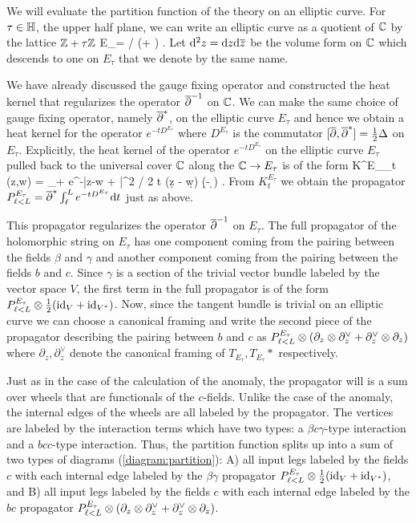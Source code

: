 We will evaluate the partition function of the theory on an elliptic curve. 
For $\tau \in \mathbb H$, the upper half plane, we can write an elliptic curve as a quotient of $\mathbb C$ by the lattice $\mathbb Z + \tau \mathbb Z$
\ben
E_\tau = \CC / (\ZZ + \tau \ZZ) .
\een 
Let ${\rm d}^2 z = {\rm d} z {\rm d} \overline{z}$ be the volume form on $\mathbb C$ which descends to one on $E_\tau$ that we denote by the same name. 

We have already discussed the gauge fixing operator and constructed the heat kernel that regularizes the operator $\overline{\partial}^{-1}$ on $\mathbb C$. 
We can make the same choice of gauge fixing operator, namely $\overline{\partial}^*$, on the elliptic curve $E_\tau$ and hence we obtain a heat kernel for the operator $e^{-t D^{E_\tau}}$ where $D^{E_\tau}$ is the commutator $[\overline{\partial}, \overline{\partial}^*] = \frac{1}{2} \Delta$ on $E_\tau$. 
Explicitly, the heat kernel of the operator $e^{-t D^{E_\tau}}$ on the elliptic curve $E_\tau$ pulled back to the universal cover $\mathbb C$ along the $\mathbb C \to E_\tau$ is of the form
\ben 
K^{E_\tau}_t (z,w) = \sum_{\lambda \in \ZZ + \tau \ZZ}  e^{-|z-w + \lambda|^2 / 2 t} (\d z - \d w) (\d \zbar - \d \wbar ) .
\een
From $K_t^{E_\tau}$ we obtain the propagator $P_{\ell < L}^{E_\tau} = \overline{\partial}^* \int_{\ell}^L e^{-t D^{E_\tau}} {\rm d} t$ just as above. 

This propagator regularizes the operator $\overline{\partial}^{-1}$ on $E_\tau$. 
The full propagator of the holomorphic string on $E_\tau$ has one component coming from the pairing between the fields $\beta$ and $\gamma$ and another component coming from the pairing between the fields $b$ and $c$. 
Since $\gamma$ is a section of the trivial vector bundle labeled by the vector space $V$, the first term in the full propagator is of the form $P_{\ell < L}^{E_\tau} \otimes \frac{1}{2} ({\rm id}_V + {\rm id}_{V^*})$.
Now, since the tangent bundle is trivial on an elliptic curve we can choose a canonical framing and write the second piece of the propagator describing the pairing between $b$ and $c$ as $P_{\ell < L}^{E_\tau} \otimes (\partial_z \otimes \partial_z^\vee + \partial_z^\vee \otimes \partial_z)$ where $\partial_z, \partial_z^\vee$ denote the canonical framing of $T_{E_\tau}, T_{E_\tau}*$ respectively. 

Just as in the case of the calculation of the anomaly, the propagator will is a sum over wheels that are functionals of the $c$-fields. 
Unlike the case of the anomaly, the internal edges of the wheels are all labeled by the propagator. 
The vertices are labeled by the interaction terms which have two types: a $\beta c \gamma$-type interaction and a $bcc$-type interaction. 
Thus, the partition function splits up into a sum of two types of diagrams (\ref{diagram:partition}): A) all input legs labeled by the fields $c$ with each internal edge labeled by the $\beta\gamma$ propagator $P_{\ell < L}^{E_\tau} \otimes \frac{1}{2} ({\rm id}_V + {\rm id}_{V^*})$, and B) all input legs labeled by the fields $c$ with each internal edge labeled by the $bc$ propagator $P_{\ell < L}^{E_\tau} \otimes (\partial_z \otimes \partial_z^\vee + \partial_z^\vee \otimes \partial_z)$. 

